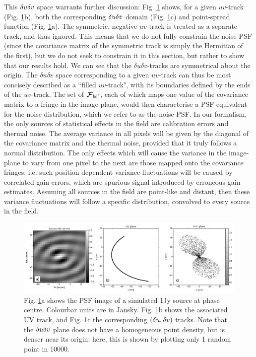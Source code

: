 \pg
This $\delta u\delta v$ space warrants further discussion: Fig. \ref{plot.psf.uv.dudv} shows, for a given $uv$-track (Fig. \ref{plot.psf.uv.dudv}b), both the corresponding $\delta u\delta v$ domain (Fig. \ref{plot.psf.uv.dudv}c) and point-spread function (Fig. \ref{plot.psf.uv.dudv}a). {The symmetric, negative $uv$-track is treated as a separate track, and thus ignored. This means that we do not fully constrain the noise-PSF (since the covariance matrix of the symmetric track is simply the Hermitian of the first), but we do not seek to constrain it in this section, but rather to show that our results hold.} We can see that the $\delta u \delta v$-tracks are symmetrical about the origin. The $\delta u \delta v$ space corresponding to a given $uv$-track can thus be most concisely described as a ``filled $uv$-track", with its boundaries defined by the ends of the $uv$-track. The set of $\bm{\mathcal{F}}_{bb'}$, each of which maps one value of the covariance matrix to a fringe in the image-plane, would then characterise a PSF equivalent for the noise distribution, which we refer to as the noise-PSF. In our formalism, the only sources of statistical effects in the field are calibration errors and thermal noise. The average variance in all pixels will be given by the diagonal of the covariance matrix and the thermal noise, provided that it truly follows a normal distribution. The only effects which will cause the variance in the image-plane to vary from one pixel to the next are those mapped onto the covariance fringes, i.e. such position-dependent variance fluctuations will be caused by correlated gain errors, which are spurious signal introduced by erroneous gain estimates. Assuming all sources in the field are point-like and distant, then these variance fluctuations will follow a specific distribution, convolved to every source in the field.


\begin{figure}[h!]
\centering
\includegraphics[width=\textwidth]{images/psfIM-dudv-labelled.png}
\caption{\label{plot.psf.uv.dudv} Fig. \ref{plot.psf.uv.dudv}a shows the PSF image of a simulated 1Jy source at phase centre. {Colourbar units are in Jansky}.  Fig. \ref{plot.psf.uv.dudv}b shows the associated UV track, and Fig. \ref{plot.psf.uv.dudv}c the corresponding $\left(\delta u,\delta v\right)$ tracks. Note that the $\delta u\delta v$ plane does not have a homogeneous point density, but is denser near its origin: here, this is shown by plotting only 1 random point in 10000.}
\end{figure}


